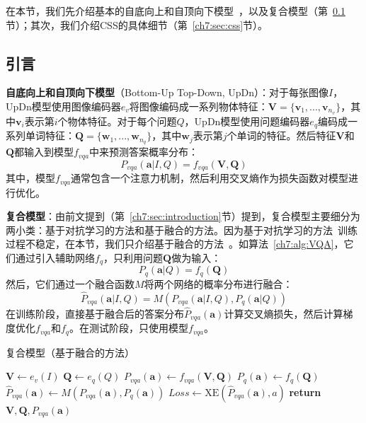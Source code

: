 在本节，我们先介绍基本的自底向上和自顶向下模型~\cite{anderson2018bottom}，以及复合模型（第~\ref{ch7:sec:preliminaries}节）；其次，我们介绍CSS的具体细节（第~\ref{ch7:sec:css}节）。

\subsection{引言} \label{ch7:sec:preliminaries}

\textbf{自底向上和自顶向下模型}（Bottom-Up Top-Down, UpDn）：对于每张图像$I$，UpDn模型使用图像编码器$e_v$将图像编码成一系列物体特征：$\bm{V} = \{\bm{v}_1, ..., \bm{v}_{n_v}\}$，其中$\bm{v}_i$表示第$i$个物体特征。对于每个问题$Q$，UpDn模型使用问题编码器$e_q$编码成一系列单词特征：$\bm{Q} = \{\bm{w}_1, ..., \bm{w}_{n_q}\}$，其中$\bm{w}_j$表示第$j$个单词的特征。然后特征$\bm{V}$和$\bm{Q}$都输入到模型$f_{vqa}$中来预测答案概率分布：
\begin{equation} \label{ch7:eq:p_vqa}
    P_{vqa}(\bm{a}|I, Q) = f_{vqa}(\bm{V}, \bm{Q})
\end{equation}
其中，模型$f_{vqa}$通常包含一个注意力机制，然后利用交叉熵作为损失函数对模型进行优化。

\textbf{复合模型}：由前文提到（第~\ref{ch7:sec:introduction}节）提到，复合模型主要细分为两小类：基于对抗学习的方法和基于融合的方法。因为基于对抗学习的方法~\cite{ramakrishnan2018overcoming,grand2019adversarial,belinkov2019don}训练过程不稳定，在本节，我们只介绍基于融合的方法~\cite{cadene2019rubi,clark2019don,mahabadi2019simple}。如算法~\ref{ch7:alg:VQA}，它们通过引入辅助网络$f_q$，只利用问题$\bm{Q}$做为输入：
\begin{equation}
P_{q}(\bm{a}|Q) = f_{q}(\bm{Q})
\end{equation}
然后，它们通过一个融合函数$M$将两个网络的概率分布进行融合：
\begin{equation}
\hat{P}_{vqa}(\bm{a}|I, Q) = M(P_{vqa}(\bm{a}|I, Q), P_{q}(\bm{a}|Q))
\end{equation}
在训练阶段，直接基于融合后的答案分布$\hat{P}_{vqa}(\bm{a})$计算交叉熵损失，然后计算梯度优化$f_{vqa}$和$f_q$。在测试阶段，只使用模型$f_{vqa}$。

\begin{algorithm}[t]
    \caption{复合模型（基于融合的方法）}\label{ch7:alg:VQA}
    \begin{algorithmic}[1]
        \State $ \bm{V} \leftarrow e_v(I) $
        \State $ \bm{Q} \leftarrow e_q(Q) $
        \State $ P_{vqa}(\bm{a}) \leftarrow f_{vqa}(\bm{V}, \bm{Q}) $
        \State $ P_{q}(\bm{a}) \leftarrow f_{q}(\bm{Q})$      
        \State $ \hat{P}_{vqa}(\bm{a}) \leftarrow M(P_{vqa}(\bm{a}), P_{q}(\bm{a}))  $
        \State $ Loss \leftarrow \text{XE}(\hat{P}_{vqa}(\bm{a}), a)$ 
        \State \textbf{return} $\bm{V}, \bm{Q}, P_{vqa}(\bm{a})$
        \EndIf 
        \EndFunction
    \end{algorithmic}
\end{algorithm}

